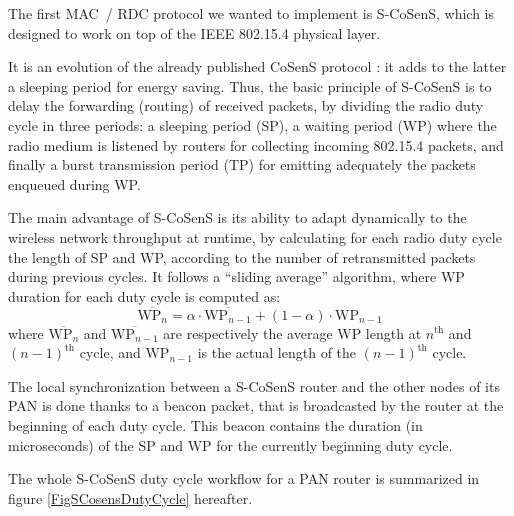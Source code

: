 \documentclass[a4paper,twoside]{article}
\begin{document}
The first MAC~/ RDC protocol we wanted to implement is S-CoSenS, which
is designed to work on top of the IEEE 802.15.4 physical layer.

It is an evolution of the already published CoSenS protocol \cite{CosensConf}:
it adds to the latter a sleeping period for energy saving.
Thus, the basic principle of S-CoSenS is to delay the forwarding (routing)
of received packets, by dividing the radio duty cycle in three periods:
a sleeping period (SP), a waiting period (WP) where the radio medium
is listened by routers for collecting incoming 802.15.4 packets, and
finally a burst transmission period (TP) for emitting adequately
the packets enqueued during WP.

The main advantage of S-CoSenS is its ability to adapt dynamically to the
wireless network throughput at runtime, by calculating for each radio duty
cycle the length of SP and WP, according to the number of retransmitted
packets during previous cycles. It follows a ``sliding average''
algorithm, where WP duration for each duty cycle is computed as:
\begin{displaymath}
\overline{\mathrm{WP}_{n}} = \alpha \cdot \overline{\mathrm{WP}_{n-1}}
                + (1 - \alpha) \cdot \mathrm{WP}_{n-1}
\end{displaymath}
where $\overline{\mathrm{WP}_{n}}$ and $\overline{\mathrm{WP}_{n-1}}$
are respectively the average WP length at $n^{\mathrm{th}}$ and
$(n-1)^{\mathrm{th}}$ cycle, and $\mathrm{WP}_{n-1}$ is the actual
length of the $(n-1)^{\mathrm{th}}$ cycle.

The local synchronization between a S-CoSenS router and the other nodes
of its PAN is done thanks to a beacon packet, that is broadcasted by
the router at the beginning of each duty cycle. This beacon contains the
duration (in microseconds) of the SP and WP for the currently beginning
duty cycle.

The whole S-CoSenS duty cycle workflow for a PAN router is summarized
in figure \ref{FigSCosensDutyCycle} hereafter.
\end{document}
